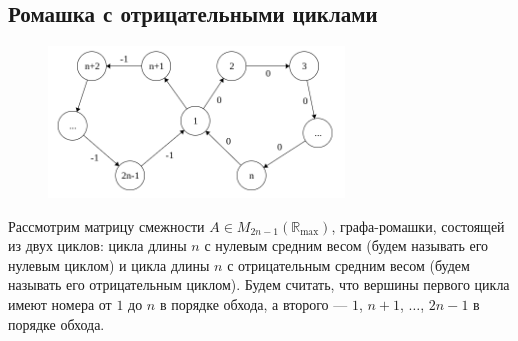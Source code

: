 \documentclass[12pt]{article}
\begin{document}
\subsection{Ромашка с отрицательными циклами}
\begin{figure}[h]
  \centering
    \includegraphics[width=0.7\textwidth]{negativeCycles}
\end{figure}

Рассмотрим матрицу смежности $A \in M_{2n-1}(\mathbb{R}_{\max})$, графа-ромашки, состоящей из двух циклов: цикла длины $n$ с нулевым средним весом (будем называть его нулевым циклом) и цикла длины $n$ с отрицательным средним весом (будем называть его отрицательным циклом). Будем считать, что вершины первого цикла имеют номера от $1$ до $n$ в порядке обхода, а второго --- $1$, $n + 1$, $\dots$, $2n - 1$ в порядке обхода.
\end{document}

